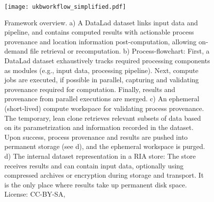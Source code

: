 \begin{figure}
	\centering
	\texttt{[image: ukbworkflow\_simplified.pdf]}
	\caption[FAIRly big: Framework overview]{Framework overview. a) A DataLad dataset links input data and pipeline, and contains computed results with actionable process provenance and location information post-computation, allowing on-demand file retrieval or recomputation. b) Process-flowchart: First, a DataLad dataset exhaustively tracks required processing components as modules (e.g., input data, processing pipeline). Next, compute jobs are executed, if possible in parallel, capturing and validating provenance required for computation. Finally, results and provenance from parallel executions are merged. c) An ephemeral (short-lived) compute workspace for validating process provenance. The temporary, lean clone retrieves relevant subsets of data based on its parametrization and information recorded in the dataset. Upon success, process provenance and results are pushed into permanent storage (see d), and the ephemeral workspace is purged. d) The internal dataset representation in a RIA store: The store receives results and can contain input data, optionally using compressed archives or encryption during storage and transport. It is the only place where results take up permanent disk space. License: CC-BY-SA, \citet{wagner2022fairly}}
	\label{fig:fairly_workflow}
\end{figure}


